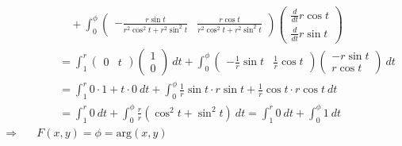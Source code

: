 \documentclass[11pt,a4paper]{book}
\newcommand{\1}    	{\mathbbm{1}}
\begin{document}
\begin{align*}
	&\qquad\quad + 
	\int_0^\phi \left( \begin{array}{cc}
		-\frac{r \sin t}{r^2 \cos^2 t + r^2 \sin^2 t} & 
		\frac{r \cos t}{r^2 \cos^2 t + r^2 \sin^2 t}
	\end{array} \right)
	\left( \begin{array}{c}
		\frac{d}{dt} r \cos t \\
		\frac{d}{dt} r \sin t
	\end{array} \right) \\
	& \qquad = 
	\int_1^r \left( \begin{array}{cc}
		0 & t
	\end{array} \right)
	\left( \begin{array}{c}
		1 \\
		 0
	\end{array} \right)~dt + 
	\int_0^\phi
	\left( \begin{array}{cc}
		-\frac{1}{r} \sin t & \frac{1}{r} \cos t
	\end{array} \right)
	\left( \begin{array}{c}
		-r \sin t \\
		r \cos t
	\end{array} \right)~dt \\
	& \qquad = 
	\int_1^r 0\cdot 1 + t \cdot 0 ~dt+ \int_0^\phi \frac{1}{r} \sin t \cdot r \sin t + \frac{1}{r} \cos t \cdot r \cos t ~dt \\
	& \qquad = 
	\int_1^r 0 ~dt + \int_0^\phi \frac{r}{r} \left( \cos^2 t + \sin^2 t \right)~dt =
	\int_1^r 0 ~dt + \int_0^\phi 1 ~dt \\
	\Rightarrow \quad & F(x,y) = \phi = \textrm{arg}(x,y)
\end{align*}
\end{document}

